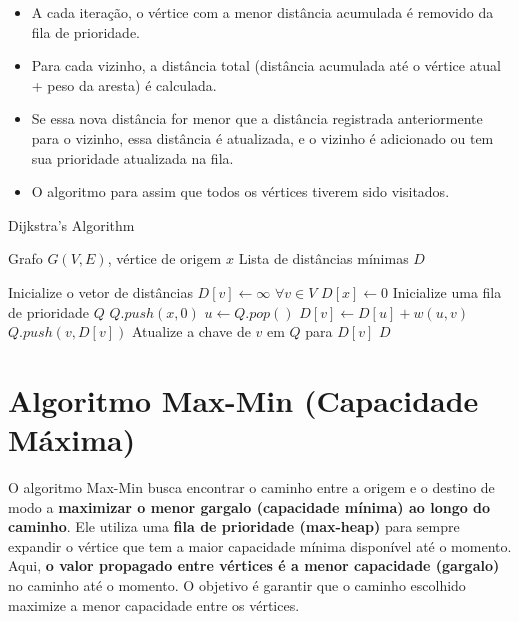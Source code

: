 \documentclass[12pt]{article}
\begin{document}
\begin{itemize}
    \item A cada iteração, o vértice com a menor distância acumulada é removido da fila de prioridade.
    \item Para cada vizinho, a distância total (distância acumulada até o vértice atual + peso da aresta) é calculada.
    \item Se essa nova distância for menor que a distância registrada anteriormente para o vizinho, 
    essa distância é atualizada, e o vizinho é adicionado ou tem sua prioridade atualizada na fila.
    \item O algoritmo para assim que todos os vértices tiverem sido visitados.
\end{itemize}


\begin{algorithm}
\caption{Dijkstra's Algorithm}
\begin{algorithmic}[1]
\REQUIRE Grafo \( G(V, E) \), vértice de origem \( x \)
\ENSURE Lista de distâncias mínimas \( D \)

\STATE Inicialize o vetor de distâncias \( D[v] \leftarrow \infty \) \(\forall v \in V\)
\STATE \( D[x] \leftarrow 0 \)
\STATE Inicialize uma fila de prioridade \( Q \)
\STATE \( Q.push(x, 0) \)
    \STATE \( u \leftarrow Q.pop() \)
            \STATE \( D[v] \leftarrow D[u] + w(u, v) \)
                \STATE \( Q.push(v, D[v]) \)
            \ELSE
                \STATE Atualize a chave de \( v \) em \( Q \) para \( D[v] \)
            \ENDIF
        \ENDIF
    \ENDFOR
\ENDWHILE
\RETURN \( D \)
\end{algorithmic}
\end{algorithm}

\newpage

\section{Algoritmo Max-Min (Capacidade Máxima)}

O algoritmo Max-Min busca encontrar o caminho entre a origem e o destino de modo a \textbf{maximizar o menor gargalo (capacidade mínima) ao longo do caminho}. Ele utiliza uma \textbf{fila de prioridade (max-heap)} para sempre expandir o vértice que tem a maior capacidade mínima disponível até o momento. Aqui, \textbf{o valor propagado entre vértices é a menor capacidade (gargalo)} no caminho até o momento. O objetivo é garantir que o caminho escolhido maximize a menor capacidade entre os vértices.
\end{document}
